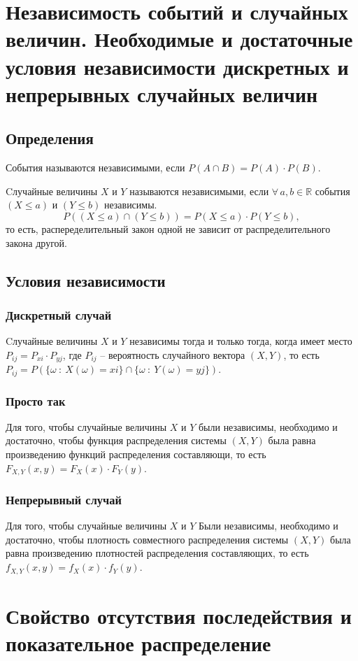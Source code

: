 \documentclass{article}
\newcommand{\R}{\mathbb{R}}
\begin{document}
\section{Независимость событий и случайных величин. Необходимые и достаточные условия независимости дискретных и непрерывных случайных величин}
\subsection{Определения}
События называются независимыми, если $P(A \cap B) = P(A) \cdot P(B)$.

Cлучайные величины $X$ и $Y$ называются независимыми, если $\forall\,a,b\in\R$ события $(X\leq a)$
и $(Y\leq b)$ независимы.
$$ P((X\leq a)\cap(Y\leq b))=P(X\leq a)\cdot P(Y\leq b), $$
то есть, распеределительный закон одной не зависит от распределительного закона другой.

\subsection{Условия независимости}
\subsubsection{Дискретный случай}
Cлучайные величины $X$ и $Y$ независимы тогда и только тогда, когда имеет место $P_{ij}=P_{xi}\cdot P_{yj}$, где $P_{ij}$ -- вероятность случайного вектора $(X,Y)$, то есть $P_{ij}=P(\{\omega\::\:X(\omega)=xi\}\cap\{\omega\::\:Y(\omega)=yj\})$.
\subsubsection{Просто так}
Для того, чтобы случайные величины $X$ и $Y$ были независимы, необходимо и достаточно, чтобы функция распределения системы $(X,Y)$ была равна произведению функций распределения составляющи, то есть $F_{X,Y}(x,y)=F_X(x)\cdot F_Y(y)$.
\subsubsection{Непрерывный случай}
Для того, чтобы случайные величины $X$ и $Y$ Были независимы, необходимо и достаточно, чтобы плотность совместного распределения системы $(X,Y)$ была равна произведению плотностей распределения составляющих, то есть $f_{X,Y}(x,y)=f_X(x)\cdot f_Y(y)$.
\newpage
\section{Свойство отсутствия последействия и показательное распределение}
\end{document}

